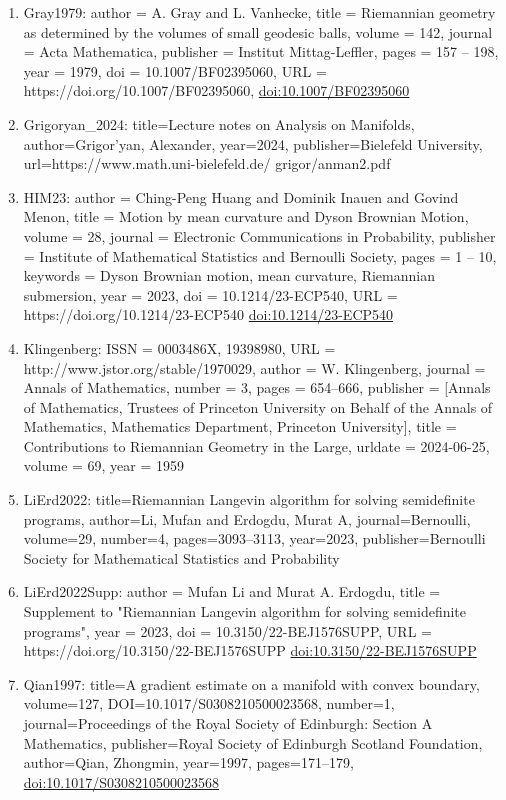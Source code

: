 \documentclass[11pt]{article}
\begin{document}
\begin{enumerate}[leftmargin=*]
  \item Gray1979: author = A. Gray and L. Vanhecke, title = Riemannian geometry as determined by the volumes of small geodesic balls, volume = 142, journal = Acta Mathematica, publisher = Institut Mittag-Leffler, pages = 157 -- 198, year = 1979, doi = 10.1007/BF02395060, URL = https://doi.org/10.1007/BF02395060, \href{https://doi.org/10.1007/BF02395060}{doi:10.1007/BF02395060}
  \item Grigoryan\_2024: title=Lecture notes on Analysis on Manifolds, author=Grigor’yan, Alexander, year=2024, publisher=Bielefeld University, url=https://www.math.uni-bielefeld.de/ grigor/anman2.pdf
  \item HIM23: author = Ching-Peng Huang and Dominik Inauen and Govind Menon, title = Motion by mean curvature and Dyson Brownian Motion, volume = 28, journal = Electronic Communications in Probability, publisher = Institute of Mathematical Statistics and Bernoulli Society, pages = 1 -- 10, keywords = Dyson Brownian motion, mean curvature, Riemannian submersion, year = 2023, doi = 10.1214/23-ECP540, URL = https://doi.org/10.1214/23-ECP540 \href{https://doi.org/10.1214/23-ECP540}{doi:10.1214/23-ECP540}
  \item Klingenberg: ISSN = 0003486X, 19398980, URL = http://www.jstor.org/stable/1970029, author = W. Klingenberg, journal = Annals of Mathematics, number = 3, pages = 654--666, publisher = [Annals of Mathematics, Trustees of Princeton University on Behalf of the Annals of Mathematics, Mathematics Department, Princeton University], title = Contributions to Riemannian Geometry in the Large, urldate = 2024-06-25, volume = 69, year = 1959
  \item LiErd2022: title=Riemannian Langevin algorithm for solving semidefinite programs, author=Li, Mufan and Erdogdu, Murat A, journal=Bernoulli, volume=29, number=4, pages=3093--3113, year=2023, publisher=Bernoulli Society for Mathematical Statistics and Probability
  \item LiErd2022Supp: author = Mufan Li and Murat A. Erdogdu, title = Supplement to "Riemannian Langevin algorithm for solving semidefinite programs", year = 2023, doi = 10.3150/22-BEJ1576SUPP, URL = https://doi.org/10.3150/22-BEJ1576SUPP \href{https://doi.org/10.3150/22-BEJ1576SUPP}{doi:10.3150/22-BEJ1576SUPP}
  \item Qian1997: title=A gradient estimate on a manifold with convex boundary, volume=127, DOI=10.1017/S0308210500023568, number=1, journal=Proceedings of the Royal Society of Edinburgh: Section A Mathematics, publisher=Royal Society of Edinburgh Scotland Foundation, author=Qian, Zhongmin, year=1997, pages=171--179, \href{https://doi.org/10.1017/S0308210500023568}{doi:10.1017/S0308210500023568}

\end{enumerate}
\end{document}
